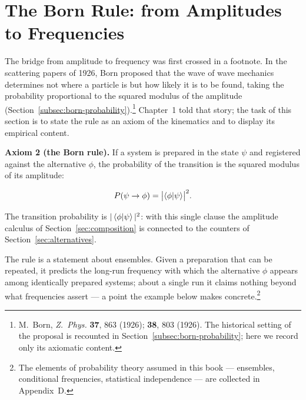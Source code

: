 \section{The Born Rule: from Amplitudes to Frequencies}
\label{sec:born}

The bridge from amplitude to frequency was first crossed in a footnote. In the scattering papers of 1926, Born proposed that the wave of wave mechanics determines not where a particle is but how likely it is to be found, taking the probability proportional to the squared modulus of the amplitude (Section~\ref{subsec:born-probability}).\footnote{M.~Born, \emph{Z.~Phys.} \textbf{37}, 863 (1926); \textbf{38}, 803 (1926). The historical setting of the proposal is recounted in Section~\ref{subsec:born-probability}; here we record only its axiomatic content.} Chapter~1 told that story; the task of this section is to state the rule as an axiom of the kinematics and to display its empirical content.

\textbf{Axiom 2 (the Born rule).} If a system is prepared in the state $\psi$ and registered against the alternative $\phi$, the probability of the transition is the squared modulus of its amplitude:
\begin{linenomath}
\begin{equation}
    P(\psi \to \phi) = \bigl|\braket{\phi|\psi}\bigr|^2 .
    \label{eq:born-rule}
\end{equation}
\end{linenomath}
The transition probability is $|\braket{\phi|\psi}|^2$: with this single clause the amplitude calculus of Section~\ref{sec:composition} is connected to the counters of Section~\ref{sec:alternatives}.

The rule is a statement about ensembles. Given a preparation that can be repeated, it predicts the long-run frequency with which the alternative $\phi$ appears among identically prepared systems; about a single run it claims nothing beyond what frequencies assert --- a point the example below makes concrete.\footnote{The elements of probability theory assumed in this book --- ensembles, conditional frequencies, statistical independence --- are collected in Appendix~D.}

